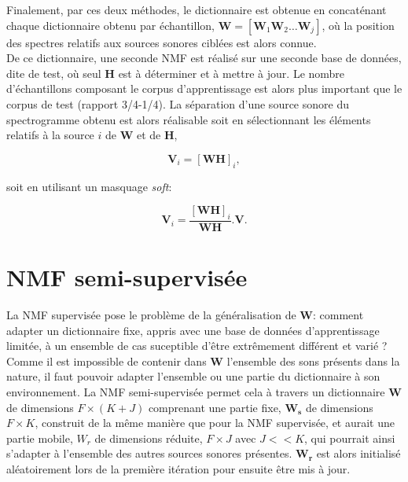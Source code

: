 Finalement, par ces deux méthodes, le dictionnaire est obtenue en concaténant chaque dictionnaire obtenu par échantillon, $\mathbf{W} = \left[\mathbf{W}_1 \mathbf{W}_2 \dots \mathbf{W}_j\right]$, où la position des spectres relatifs aux sources sonores ciblées est alors connue. \\

De ce dictionnaire, une seconde NMF est réalisé sur une seconde base de données, dite de test, où seul $\mathbf{H}$ est à déterminer et à mettre à jour.  Le nombre d'échantillons composant le corpus d'apprentissage est alors plus important que le corpus de test (rapport 3/4-1/4). La séparation d'une source sonore du spectrogramme obtenu est alors réalisable soit en sélectionnant les éléments relatifs à la source $i$ de $\mathbf{W}$ et de $\mathbf{H}$,  

\begin{equation}
\mathbf{V}_i = \left[\mathbf{WH}\right]_i, 
\end{equation}

soit en utilisant un masquage \textit{soft}: 

\begin{equation}
\mathbf{V}_i = \frac{\left[\mathbf{WH}\right]_i}{\mathbf{WH}}.\mathbf{V}.
\end{equation}



\section{NMF semi-supervisée}\label{NMF_SS}
La NMF supervisée pose le problème de la généralisation de $\mathbf{W}$: comment adapter un dictionnaire fixe, appris avec une base de données d'apprentissage limitée, à un ensemble de cas suceptible d'être extrêmement différent et varié ? 
Comme il est impossible de contenir dans $\mathbf{W}$ l'ensemble des sons présents dans la nature, il faut pouvoir adapter l'ensemble ou une partie du dictionnaire à son environnement. La NMF semi-supervisée \cite{lee_semi-supervised_2010} \cite{smaragdis2007supervised} permet cela à travers un dictionnaire $\mathbf{W}$ de dimensions $F \times (K+J)$ comprenant une partie fixe, $\mathbf{W_s}$ de dimensions $F \times K$, construit de la même manière que pour la NMF supervisée, et aurait une partie mobile,  $W_r$ de dimensions réduite, $F \times J$ avec $J << K$, qui pourrait ainsi s'adapter à l'ensemble des autres sources sonores présentes. $\mathbf{W_r}$ est alors initialisé aléatoirement lors de la première itération pour ensuite être mis à jour.\\

